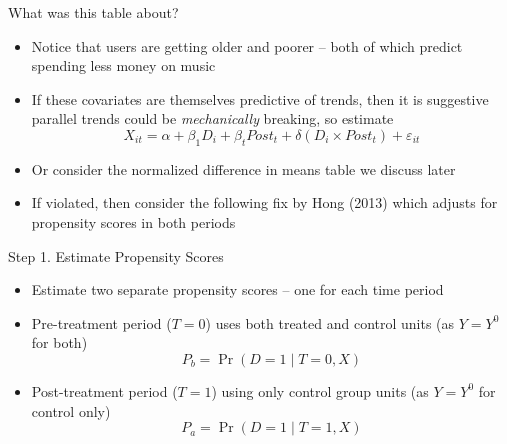 \documentclass{beamer}
\begin{document}
\begin{frame}{What was this table about?}

\begin{itemize}
\item  Notice that users are getting older and poorer -- both of which predict spending less money on music
\item If these covariates are themselves predictive of trends, then it is suggestive parallel trends could be \emph{mechanically} breaking, so estimate $$X_{it} = \alpha + \beta_1 D_i + \beta_t Post_t + \delta ( D_i \times Post_t ) + \varepsilon_{it}$$ 
\item Or consider the normalized difference in means table we discuss later
\item If violated, then consider the following fix by Hong (2013) which adjusts for propensity scores in both periods
\end{itemize}

\end{frame}



\begin{frame}{Step 1. Estimate Propensity Scores}
\begin{itemize}
  \item Estimate two separate propensity scores -- one for each time period
  \item Pre-treatment period ($T = 0$) uses both treated and control units (as $Y=Y^0$ for both)
  \begin{equation*}
    P_b = \Pr(D=1 \mid T=0, X)
  \end{equation*}
  \item Post-treatment period ($T = 1$) using only control group units (as $Y=Y^0$ for control only)
  \begin{equation*}
    P_a = \Pr(D=1 \mid T=1, X)
  \end{equation*}
\end{itemize}
\end{frame}
\end{document}
